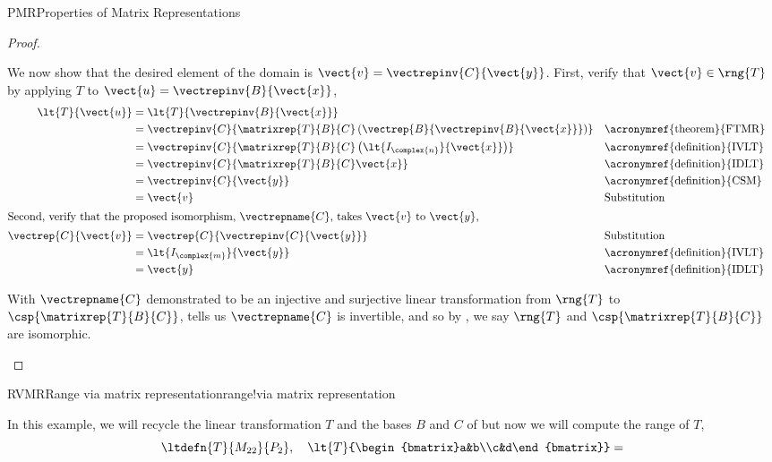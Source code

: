 \begin{subsect}{PMR}{Properties of Matrix Representations}
\begin{proof}
%
\begin{para}We now show that the desired element of the domain is $\vect{v}=\vectrepinv{C}{\vect{y}}$.     First, verify that $\vect{v}\in\rng{T}$ by applying $T$ to $\vect{u}=\vectrepinv{B}{\vect{x}}$,
%
\begin{align*}
\lt{T}{\vect{u}}&=\lt{T}{\vectrepinv{B}{\vect{x}}}\\
&=\vectrepinv{C}{\matrixrep{T}{B}{C}\left(\vectrep{B}{\vectrepinv{B}{\vect{x}}}\right)}&&\text{\acronymref{theorem}{FTMR}}\\
&=\vectrepinv{C}{\matrixrep{T}{B}{C}\left(\lt{I_{\complex{n}}}{\vect{x}}\right)}&&\text{\acronymref{definition}{IVLT}}\\
&=\vectrepinv{C}{\matrixrep{T}{B}{C}\vect{x}}&&\text{\acronymref{definition}{IDLT}}\\
&=\vectrepinv{C}{\vect{y}}&&\text{\acronymref{definition}{CSM}}\\
&=\vect{v}&&\text{Substitution}\\
%
\intertext{Second, verify that the proposed isomorphism, $\vectrepname{C}$, takes $\vect{v}$ to $\vect{y}$,}
%
\vectrep{C}{\vect{v}}&=\vectrep{C}{\vectrepinv{C}{\vect{y}}}&&\text{Substitution}\\
&=\lt{I_{\complex{m}}}{\vect{y}}&&\text{\acronymref{definition}{IVLT}}\\
&=\vect{y}&&\text{\acronymref{definition}{IDLT}}
%
\end{align*}
\end{para}
%
\begin{para}With $\vectrepname{C}$ demonstrated to be an injective and surjective linear transformation from $\rng{T}$ to $\csp{\matrixrep{T}{B}{C}}$,  tells us $\vectrepname{C}$ is invertible, and so by , we say $\rng{T}$ and $\csp{\matrixrep{T}{B}{C}}$ are isomorphic.\end{para}
%
\end{proof}
%
\begin{example}{RVMR}{Range via matrix representation}{range!via matrix representation}
%
\begin{para}In this example, we will recycle the linear transformation $T$ and the bases $B$ and $C$ of  but now we will compute the range of $T$,
%
\begin{equation*}
\ltdefn{T}{M_{22}}{P_2},\quad \lt{T}{\begin{bmatrix}a&b\\c&d\end{bmatrix}}=

\end{equation*}
\end{para}
\end{example}
\end{subsect}
